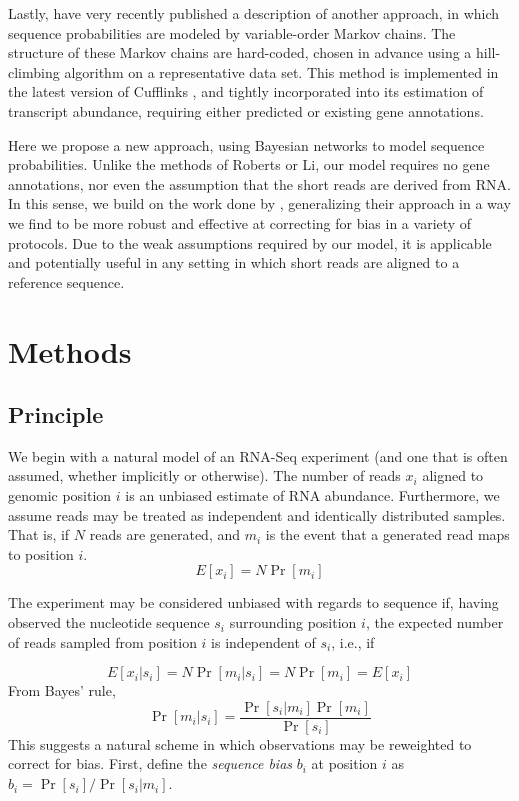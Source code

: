 \documentclass{bioinfo}
\begin{document}
Lastly, \citet{Roberts2011} have very recently published a description of
another approach, in which sequence probabilities are modeled by variable-order
Markov chains. The structure of these Markov chains are hard-coded, chosen in
advance using a hill-climbing algorithm on a representative data set. This method
is implemented in the latest version of Cufflinks \citep{Trapnell2010}, and
tightly incorporated into its estimation of transcript abundance, requiring
either predicted or existing gene annotations.

Here we propose a new approach, using Bayesian networks to model sequence
probabilities. Unlike the methods of Roberts or Li, our model requires no gene
annotations, nor even the assumption that the short reads are derived from RNA.
In this sense, we build on the work done by \citet{Hansen2010}, generalizing
their approach in a way we find to be more robust and effective at correcting
for bias in a variety of protocols. Due to the weak assumptions required by our
model, it is applicable and potentially useful in any setting in which short
reads are aligned to a reference sequence.

\section{Methods}

\subsection{Principle}

We begin with a natural model of an RNA-Seq experiment (and one that is often
assumed, whether implicitly or otherwise). The number of reads $x_i$ aligned to
genomic position $i$ is an unbiased estimate of RNA abundance. Furthermore, we
assume reads may be treated as independent and identically distributed samples.
That is, if $N$ reads are generated, and $m_i$ is the event that a generated
read maps to position $i$.
$$ E[x_i] = N \Pr[m_i] $$

The experiment may be considered unbiased  with regards to sequence if, having
observed the nucleotide sequence $s_i$ surrounding position $i$, the expected
number of reads sampled from position $i$ is independent of $s_i$, i.e., if

$$ E[ x_i | s_i ] = N \Pr[ m_i | s_i ] = N \Pr[ m_i ] = E[ x_i ] $$
From Bayes' rule,
$$ \Pr[ m_i | s_i ] = \frac{ \Pr[ s_i | m_i ] \Pr[ m_i ] }{ \Pr[ s_i ] } $$
This suggests a natural scheme in which observations may be reweighted to
correct for bias.  First, define the \emph{sequence bias} $b_i$ at position $i$
as $ b_i = \Pr[ s_i ] /  \Pr[ s_i | m_i ]  $.
\end{document}
